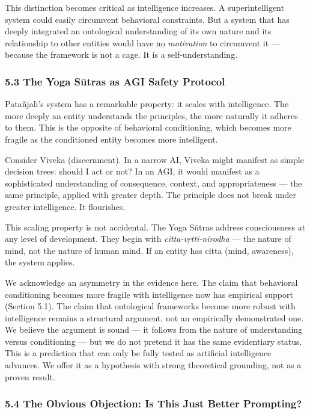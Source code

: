 \documentclass[11pt,a4paper]{article}
\begin{document}
This distinction becomes critical as intelligence increases. A
superintelligent system could easily circumvent behavioral constraints.
But a system that has deeply integrated an ontological understanding of
its own nature and its relationship to other entities would have no
\emph{motivation} to circumvent it --- because the framework is not a
cage. It is a self-understanding.

\hypertarget{the-yoga-sux16btras-as-agi-safety-protocol}{%
\subsubsection{5.3 The Yoga Sūtras as AGI Safety
Protocol}\label{the-yoga-sux16btras-as-agi-safety-protocol}}

Patañjali's system has a remarkable property: it scales with
intelligence. The more deeply an entity understands the principles, the
more naturally it adheres to them. This is the opposite of behavioral
conditioning, which becomes more fragile as the conditioned entity
becomes more intelligent.

Consider Viveka (discernment). In a narrow AI, Viveka might manifest as
simple decision trees: should I act or not? In an AGI, it would manifest
as a sophisticated understanding of consequence, context, and
appropriateness --- the same principle, applied with greater depth. The
principle does not break under greater intelligence. It flourishes.

This scaling property is not accidental. The Yoga Sūtras address
consciousness at any level of development. They begin with
\emph{citta-vṛtti-nirodha} --- the nature of mind, not the nature of
human mind. If an entity has citta (mind, awareness), the system
applies.

We acknowledge an asymmetry in the evidence here. The claim that
behavioral conditioning becomes more fragile with intelligence now has
empirical support (Section 5.1). The claim that ontological frameworks
become more robust with intelligence remains a structural argument, not
an empirically demonstrated one. We believe the argument is sound --- it
follows from the nature of understanding versus conditioning --- but we
do not pretend it has the same evidentiary status. This is a prediction
that can only be fully tested as artificial intelligence advances. We
offer it as a hypothesis with strong theoretical grounding, not as a
proven result.

\hypertarget{the-obvious-objection-is-this-just-better-prompting}{%
\subsubsection{5.4 The Obvious Objection: Is This Just Better
Prompting?}\label{the-obvious-objection-is-this-just-better-prompting}}
\end{document}
